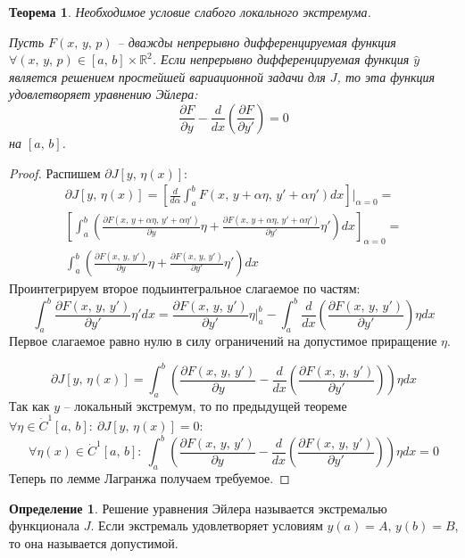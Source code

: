 \documentclass[a4paper,12pt]{article}
\theoremstyle{plain}
\newtheorem{theorem}{Теорема}[section]
\theoremstyle{definition}
\newtheorem{definition}{Определение}[section]
\theoremstyle{remark}
\begin{document}
\begin{theorem}
	Необходимое условие слабого локального экстремума.

	Пусть $F(x,\,y,\,p)$ -- дважды непрерывно дифференцируемая функция $\forall (x,\,y,\,p) \in [a,\,b]\times\mathbb{R}^2$. Если непрерывно дифференцируемая функция $\hat{y}$ является решением простейшей вариационной задачи для $J$, то эта функция удовлетворяет уравнению Эйлера:
	\[\frac{\partial F}{\partial y} - \frac{d}{dx}\left(\frac{\partial F}{\partial y'}\right) = 0\]
	на $[a,\,b]$.
\end{theorem}

\begin{proof}
	Распишем $\partial J[y,\,\eta(x)]$:
	\begin{align*}
		\partial J[y,\,\eta(x)] = \left[\frac{d}{d\alpha}\int_a^bF(x,\, y + \alpha\eta,\, y' + \alpha\eta')dx\right]|_{\alpha = 0} =                                                                                \\
		\left[\int_a^b \left(\frac{\partial F(x,\,y + \alpha\eta,\, y' + \alpha\eta')}{\partial y}\eta + \frac{\partial F(x,\,y + \alpha\eta,\, y' + \alpha\eta')}{\partial y'}\eta'\right)dx\right]_{\alpha = 0} = \\
		\int_a^b \left(\frac{\partial F(x,\,y,\,y')}{\partial y}\eta + \frac{\partial F(x,\,y,\,y')}{\partial y'}\eta'\right)dx
	\end{align*}
	Проинтегрируем второе подыинтегральное слагаемое по частям:
	\[\int_a^b \frac{\partial F(x,\,y,\,y')}{\partial y'}\eta'dx = \frac{\partial F(x,\,y,\,y')}{\partial y'}\eta|_a^b - \int_a^b \frac{d}{dx}\left(\frac{\partial F(x,\,y,\,y')}{\partial y'}\right)\eta dx\]
	Первое слагаемое равно нулю в силу ограничений на допустимое приращение $\eta$.

	\[\partial J[y,\,\eta(x)] = \int_a^b \left(\frac{\partial F(x,\,y,\,y')}{\partial y} - \frac{d}{dx}\left(\frac{\partial F(x,\,y,\,y')}{\partial y'}\right)\right)\eta dx\]
	Так как $y$ -- локальный экстремум, то по предыдущей теореме $\forall \eta \in \dot{C}^1[a,\,b]:\: \partial J[y,\,\eta(x)] = 0$:
	\[\forall \eta(x) \in \dot{C}^1[a,\,b] :\: \int_a^b \left(\frac{\partial F(x,\,y,\,y')}{\partial y} - \frac{d}{dx}\left(\frac{\partial F(x,\,y,\,y')}{\partial y'}\right)\right)\eta dx = 0\]
	Теперь по лемме Лагранжа получаем требуемое.
\end{proof}

\begin{definition}
	Решение уравнения Эйлера называется экстремалью функционала $J$. Если экстремаль удовлетворяет условиям $y(a) = A,\, y(b) = B$, то она называется допустимой.
\end{definition}
\end{document}
